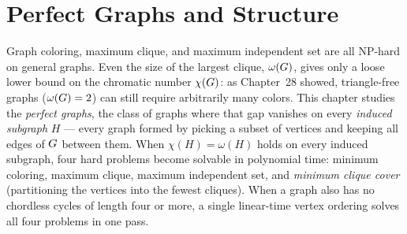 \chapter{Perfect Graphs and Structure}

Graph coloring, maximum clique, and maximum independent set are all $\mathrm{NP}$-hard on general graphs. Even the size of the largest clique, $\omega(G)$, gives only a loose lower bound on the chromatic number $\chi(G)$: as Chapter~28 showed, triangle-free graphs ($\omega(G)=2$) can still require arbitrarily many colors. This chapter studies the \emph{perfect graphs}, the class of graphs where that gap vanishes on every \emph{induced subgraph} $H$ --- every graph formed by picking a subset of vertices and keeping all edges of $G$ between them. When $\chi(H) = \omega(H)$ holds on every induced subgraph, four hard problems become solvable in polynomial time: minimum coloring, maximum clique, maximum independent set, and \emph{minimum clique cover} (partitioning the vertices into the fewest cliques). When a graph also has no chordless cycles of length four or more, a single linear-time vertex ordering solves all four problems in one pass.

